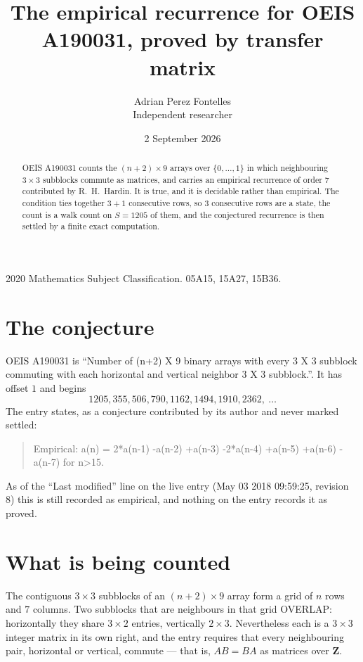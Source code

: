 \documentclass[11pt,a4paper]{article}
\title{The empirical recurrence for OEIS A190031, proved by transfer matrix}
\author{Adrian Perez Fontelles\\ \small Independent researcher}
\date{2 September 2026}
\theoremstyle{plain}
\theoremstyle{definition}
\begin{document}
\maketitle

\begin{abstract}
OEIS A190031 counts the $(n+2)\times9$ arrays over $\{0,\dots,1\}$ in which
neighbouring $3\times3$ subblocks commute as matrices, and carries an empirical
recurrence
of order $7$ contributed by R.~H.~Hardin. It is true, and it is decidable rather than
empirical. The condition ties together $3+1$ consecutive rows, so $3$ consecutive rows are
a state, the count is a walk count on $S=1205$ of them, and the conjectured recurrence is then
settled by a finite exact computation.
\end{abstract}

\noindent\small 2020 Mathematics Subject Classification. 05A15, 15A27, 15B36.\normalsize

\section{The conjecture}

OEIS A190031 is ``Number of (n+2) X 9 binary arrays with every 3 X 3 subblock commuting with each horizontal and vertical neighbor 3 X 3 subblock.''. It has offset $1$ and begins
\[
1205, 355, 506, 790, 1162, 1494, 1910, 2362,\ \dots
\]
The entry states, as a conjecture contributed by its author and never marked settled:
\begin{quote}
Empirical: a(n) = 2*a(n-1) -a(n-2) +a(n-3) -2*a(n-4) +a(n-5) +a(n-6) -a(n-7) for n>15.
\end{quote}
As of the ``Last modified'' line on the live entry (May 03 2018 09:59:25, revision 8) this is still
recorded as empirical, and nothing on the entry records it as proved.

\section{What is being counted}

The contiguous $3\times3$ subblocks of an $(n+2)\times9$ array form a grid of $n$
rows and $7$ columns. Two subblocks that are neighbours in that
grid OVERLAP: horizontally they share $3\times2$ entries, vertically
$2\times3$. Nevertheless each is a $3\times3$ integer matrix in its own right, and
the entry requires that every neighbouring pair, horizontal or vertical, commute --- that is,
$AB=BA$ as matrices over $\mathbf{Z}$.
\end{document}
